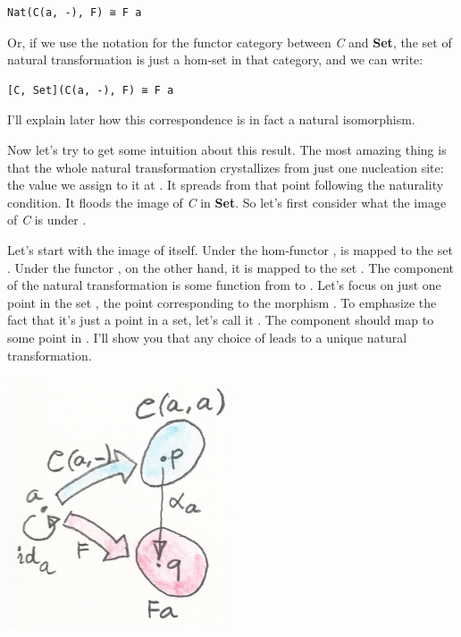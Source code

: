 \begin{verbatim}
Nat(C(a, -), F) ≅ F a
\end{verbatim}

Or, if we use the notation \code{{[}C,\ Set{]}} for the functor
category between \emph{C} and \textbf{Set}, the set of natural
transformation is just a hom-set in that category, and we can write:

\begin{verbatim}
[C, Set](C(a, -), F) ≅ F a
\end{verbatim}

I'll explain later how this correspondence is in fact a natural
isomorphism.

Now let's try to get some intuition about this result. The most amazing
thing is that the whole natural transformation crystallizes from just
one nucleation site: the value we assign to it at . It
spreads from that point following the naturality condition. It floods
the image of \emph{C} in \textbf{Set}. So let's first consider what the
image of \emph{C} is under .

Let's start with the image of  itself. Under the hom-functor
,  is mapped to the set .
Under the functor , on the other hand, it is mapped to the set
. The component of the natural transformation 
is some function from  to . Let's focus on
just one point in the set , the point corresponding to
the morphism . To emphasize the fact that it's just a point
in a set, let's call it . The component  should map
 to some point  in . I'll show you that
any choice of  leads to a unique natural transformation.

\includegraphics{images/yoneda3.png}

